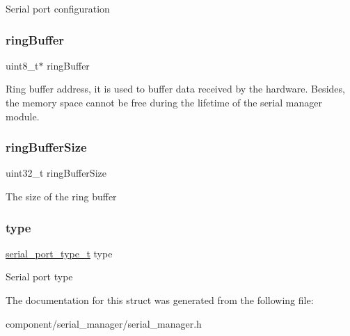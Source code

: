Serial port configuration \mbox{\label{struct__serial__manager__config_a5aad89b7fedb6b6bb7b67a2f200517e4}} 
\subsubsection{\texorpdfstring{ringBuffer}{ringBuffer}}
{\footnotesize\ttfamily uint8\+\_\+t$\ast$ ring\+Buffer}

Ring buffer address, it is used to buffer data received by the hardware. Besides, the memory space cannot be free during the lifetime of the serial manager module. \mbox{\label{struct__serial__manager__config_a6091a0a1e610e8c014fc4b070392fc08}} 
\subsubsection{\texorpdfstring{ringBufferSize}{ringBufferSize}}
{\footnotesize\ttfamily uint32\+\_\+t ring\+Buffer\+Size}

The size of the ring buffer \mbox{\label{struct__serial__manager__config_a03112637c9c98af9974c331c761283a5}} 
\subsubsection{\texorpdfstring{type}{type}}
{\footnotesize\ttfamily \mbox{\hyperlink{group__serialmanager_gaa7dc5f93aacda72d14bb0fa66b0401f3}{serial\+\_\+port\+\_\+type\+\_\+t}} type}

Serial port type 

The documentation for this struct was generated from the following file\+:\begin{DoxyCompactItemize}
\item 
component/serial\+\_\+manager/serial\+\_\+manager.\+h\end{DoxyCompactItemize}
